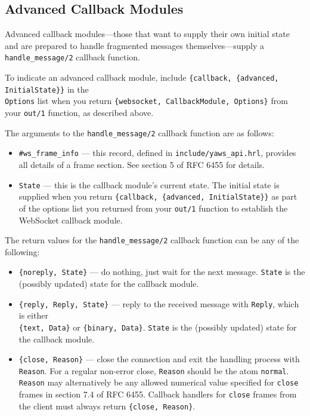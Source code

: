 \documentclass[11pt,oneside,english]{book}
\begin{document}
\subsection{Advanced Callback Modules}
\label{advanced_ws}

Advanced callback modules---those that want to supply their own
initial state and are prepared to handle fragmented messages
themselves---supply a \verb+handle_message/2+ callback function.

To indicate an advanced callback module, include
\verb+{callback, {advanced, InitialState}}+ in the \\ \verb+Options+
list when you return \verb+{websocket, CallbackModule, Options}+ from
your \verb+out/1+ function, as described above.

The arguments to the \verb+handle_message/2+ callback
function are as follows:

\begin{itemize}

\item \verb+#ws_frame_info+ --- this record, defined in
  \verb+include/yaws_api.hrl+, provides all details of a frame
  section. See section 5 of RFC 6455 for details.

\item \verb+State+ --- this is the callback module's current
  state. The initial state is supplied when you return
  \verb+{callback, {advanced, InitialState}}+ as part of the options
  list you returned from your \verb+out/1+ function to establish the
  WebSocket callback module.

\end{itemize}

The return values for the \verb+handle_message/2+ callback function
can be any of the following:

\begin{itemize}

\item \verb+{noreply, State}+ --- do nothing, just wait for the next
  message. \verb+State+ is the (possibly updated) state for the
  callback module.

\item \verb+{reply, Reply, State}+ --- reply to the received message
  with \verb+Reply+, which is either \\ \verb+{text, Data}+ or
  \verb+{binary, Data}+. \verb+State+ is the (possibly updated) state
  for the callback module.

\item \verb+{close, Reason}+ --- close the connection and exit the
  handling process with \verb+Reason+. For a regular non-error close,
  \verb+Reason+ should be the atom \verb+normal+. \verb+Reason+ may
  alternatively be any allowed numerical value specified for
  \verb+close+ frames in section 7.4 of RFC 6455. Callback handlers
  for \verb+close+ frames from the client must always return
  \verb+{close, Reason}+.

\end{itemize}
\end{document}
